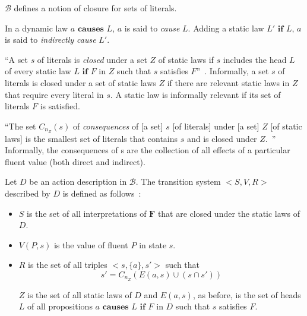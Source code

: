 $\mathcal{B}$ defines a notion of closure for sets of literals.

\begin{definition}
    In a dynamic law $a \textbf{ causes } L$, $a$ is said to \textit{cause} $L$.
    Adding a static law $L' \textbf{ if } L$, $a$ is said to \textit{indirectly cause} $L'$.
\end{definition}

\begin{definition}
    ``A set $s$ of literals is \textit{closed} under a set $Z$ of static laws if $s$ includes the head $L$ of every static law $L \textbf{ if } F$ in $Z$ such that $s$ satisfies $F$''~\citep{gelfond_action_1998}.
    Informally, a set $s$ of literals is closed under a set of static laws $Z$ if there are relevant static laws in $Z$ that require every literal in $s$.
    A static law is informally relevant if its set of literals $F$ is satisfied.
\end{definition}

\begin{definition}
    ``The set $C_{n_Z}\left(s\right)$ of \textit{consequences} of [a set] $s$ [of literals] under [a set] $Z$ [of static laws] is the smallest set of literals that contains $s$ and is closed under $Z$.~\citep{gelfond_action_1998}''
    Informally, the consequences of s are the collection of all effects of a particular fluent value (both direct and indirect).
\end{definition}

\begin{definition}

    Let $D$ be an action description in $\mathcal{B}$.
    The transition system $< S, V, R >$ described by $D$ is defined as follows~\citep{gelfond_action_1998}:

    \begin{itemize}
        \item $S$ is the set of all interpretations of $\boldsymbol{F}$ that are closed under the static laws of $D$.
        \item $ V(P, s) $ is the value of fluent $P$ in state $s$.
        \item $R$ is the set of all triples $<s, \{a\}, s'>$ such that
            $$
            s'=C_{n_Z}\left(E\left(a,s\right)\cup\left(s \cap s'\right)\right)
            $$

            $ Z $ is the set of all static laws of $D$ and $E(a, s)$, as before, is the set of heads $L$ of all propositions $a \textbf{ causes } L \textbf{ if } F$ in $D$ such that $s$ satisfies $F$.
    \end{itemize}
\end{definition}


